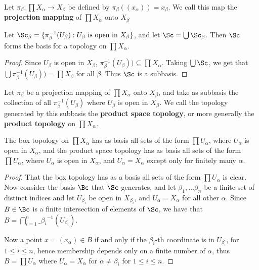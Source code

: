 \begin{definition}
    Let $\pi_{\beta}:\prod{X_{\alpha}} \rightarrow X_{\beta}$ be defined by
    $\pi_{\beta}((x_\alpha))=x_\beta$. We call this map the \textbf{projection mapping} of
    $\prod{X_{\alpha}}$ onto $X_{\beta}$
\end{definition}

\begin{theorem}\label{2.1.2}
    Let $\Sc_{\beta}=\{\pi^{-1}_{\beta}(U_{\beta}):U_{\beta} \text{ is open in } X_{\beta}\}$, and let
    $\Sc=\bigcup{\Sc_{\beta}}$. Then $\Sc$ forms the basis for a topology on  $\prod{X_{\alpha}}$.
\end{theorem}
\begin{proof}
    Since $U_{\beta}$ is open in $X_{\beta}$, $\pi^{-1}_{\beta}(U_{\beta})) \subseteq
    \prod{X_\alpha}$. Taking $\bigcup{\Sc}$, we get that $\bigcup{\pi^{-1}_{\beta}(U_{\beta}))} =
    \prod{X}_{\beta}$ for all $\beta$. Thus  $\Sc$ is a subbasis.
\end{proof}


\begin{definition}
    Let $\pi_{\beta}$ be a projection mapping of $\prod{X_{\alpha}}$ onto $X_{\beta}$, and take as
    subbasis the collection of all $\pi^{-1}_{\beta}(U_{\beta})$ where $U_{\beta}$ is open in
    $X_{\beta}$. We call the topology generated by this subbasis the \textbf{product space
    topology}, or more generally the \textbf{product topology} on $\prod{X_{\alpha}}$.
\end{definition}

\begin{theorem}\label{2.1.3}
    The box topology on $\prod{X_{\alpha}}$ has as basis all sets of the form $\prod{U_{\alpha}}$,
    where $U_{\alpha}$ is open in $X_{\alpha}$, and the product space topology has as basis all sets
    of the form $\prod{U_{\alpha}}$, where $U_{\alpha}$ is open in $X_{\alpha}$, and
    $U_{\alpha}=X_{\alpha}$ except only for finitely many $\alpha$.
\end{theorem}
\begin{proof}
    That the box topology has as a basis all sets of the form  $\prod{U_{\alpha}}$ is clear. Now
    consider the basis $\Bc$ that  $\Sc$ generates, and let  $\beta_1, \dots \beta_n$ be a finite
    set of distinct indices and let $U_{\beta_i}$ be open in $X_{\beta_i}$, and
    $U_{\alpha}=X_{\alpha}$ for all other $\alpha$. Since  $B \in \Bc$ is a finite intersection of
    elements of  $\Sc$, we have that  $B=\bigcap_{i = 1}^{n}{\_{\beta_i}^{-1}(U_{\beta_i})}$.

    Now a point $x=(x_{\alpha}) \in B$ if and only if the $\beta_i$-th coordinate is in
    $U_{\beta_i}$, for $1 \leq i \leq n$, hence membership depends only on a finite number of
    $\alpha$, thus  $B=\prod{U_{\alpha}}$ where $U_{\alpha}=X_{\alpha}$ for $\alpha \neq \beta_i$
    for  $1 \leq i \leq n$.
\end{proof}

